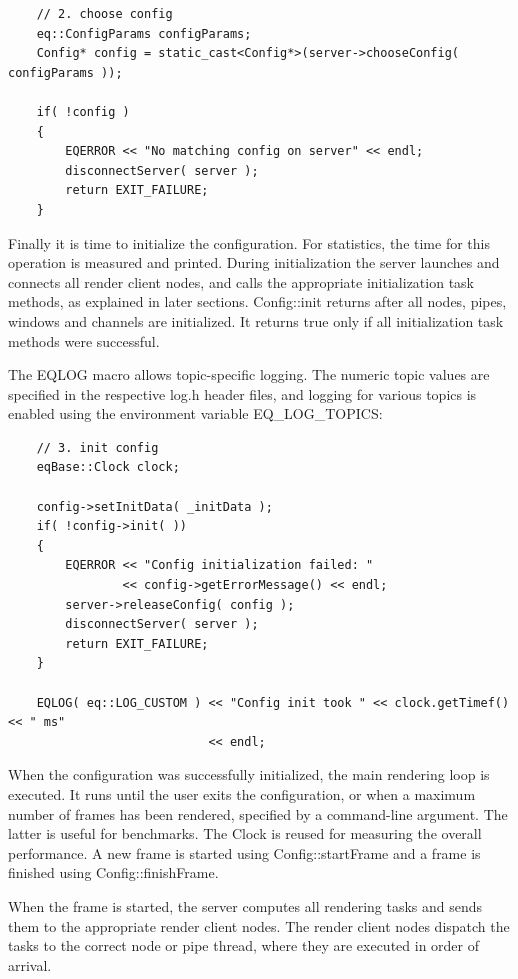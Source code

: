 \documentclass[10pt,a4]{scrartcl}
\begin{document}
{\footnotesize\begin{lstlisting}
    // 2. choose config
    eq::ConfigParams configParams;
    Config* config = static_cast<Config*>(server->chooseConfig( configParams ));

    if( !config )
    {
        EQERROR << "No matching config on server" << endl;
        disconnectServer( server );
        return EXIT_FAILURE;
    }
\end{lstlisting}}%

Finally it is time to initialize the configuration. For statistics, the
time for this operation is measured and printed. During initialization
the server launches and connects all render client nodes, and calls the
appropriate initialization task methods, as explained in later
sections. \textsf{Config::init} returns after all nodes, pipes,
windows and channels are initialized. It returns \textsf{true} only if
all initialization task methods were successful.

The \textsf{EQLOG} macro allows topic-specific logging. The numeric
topic values are specified in the respective \textsf{log.h} header
files, and logging for various topics is enabled using the environment
variable \textsf{EQ\_LOG\_TOPICS}:

{\footnotesize\begin{lstlisting}
    // 3. init config
    eqBase::Clock clock;

    config->setInitData( _initData );
    if( !config->init( ))
    {
        EQERROR << "Config initialization failed: " 
                << config->getErrorMessage() << endl;
        server->releaseConfig( config );
        disconnectServer( server );
        return EXIT_FAILURE;
    }

    EQLOG( eq::LOG_CUSTOM ) << "Config init took " << clock.getTimef() << " ms"
                            << endl;
\end{lstlisting}}%

When the configuration was successfully initialized, the main rendering
loop is executed. It runs until the user exits the
configuration, or when a maximum number of frames has been rendered,
specified by a command-line argument. The latter is useful for
benchmarks. The \textsf{Clock} is reused for measuring the overall
performance. A new frame is started using \textsf{Config::startFrame}
and a frame is finished using \textsf{Config::finishFrame}.

When the frame is started, the server computes all rendering tasks and
sends them to the appropriate render client nodes. The render client
nodes dispatch the tasks to the correct node or pipe thread, where they
are executed in order of arrival.
\end{document}
